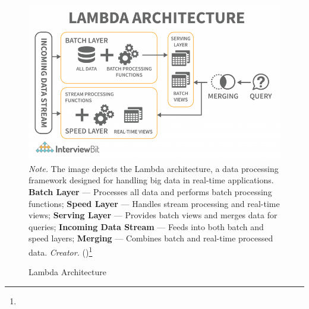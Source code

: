 \begin{figure}[H]
\caption{Lambda Architecture}
\centering
\includegraphics[width=1\linewidth]{images/Lambda-Architecture-768x475.png}
\small
\textit{Note.} The image depicts the Lambda architecture, a data processing framework designed for handling big data in real-time applications. \textbf{Batch Layer} — Processes all data and performs batch processing functions; \textbf{Speed Layer} — Handles stream processing and real-time views; \textbf{Serving Layer} — Provides batch views and merges data for queries; \textbf{Incoming Data Stream} — Feeds into both batch and speed layers; \textbf{Merging} — Combines batch and real-time processed data.
\textit{Creator.} (\cite{interviewBit})\footnote[39]{}
\end{figure}